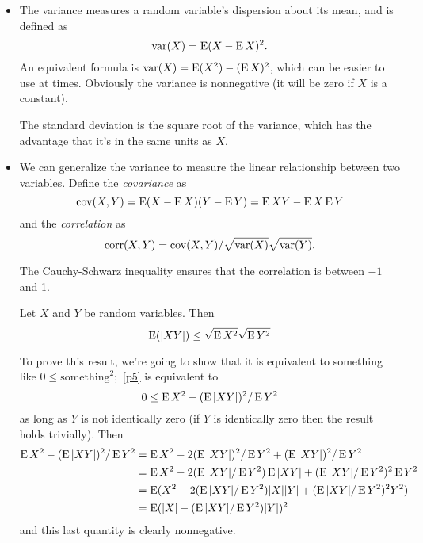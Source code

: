 \begin{itemize}[leftmargin=0pt]

\item The variance measures a random variable's dispersion about its
  mean, and is defined as
  \begin{equation*}
    \operatorname{var}(X) = \operatorname{E}(X - \operatorname{E} X)^2.
  \end{equation*}
  An equivalent formula is $\operatorname{var}(X) = \operatorname{E}(X^2) - (\operatorname{E} X)^2$, which can be
  easier to use at times.  Obviously the variance is nonnegative (it
  will be zero if $X$ is a constant).

  The standard deviation is the square root of the variance, which has
  the advantage that it's in the same units as $X$.

\item We can generalize the variance to measure the linear
  relationship between two variables.  Define the \emph{covariance} as
  \begin{equation*}
    \operatorname{cov}(X,Y) = \operatorname{E}(X - \operatorname{E} X) (Y - \operatorname{E} Y) = \operatorname{E} XY - \operatorname{E} X \operatorname{E} Y
  \end{equation*}
  and the \emph{correlation} as
  \begin{equation*}
    \operatorname{corr}(X, Y) = \operatorname{cov}(X,Y) / \sqrt{\operatorname{var}(X)} \sqrt{\operatorname{var}(Y)}.
  \end{equation*}

  The Cauchy-Schwarz inequality ensures that the correlation is
  between $-1$ and 1.
  \begin{thm}
    Let $X$ and $Y$ be random variables.  Then 
    \begin{equation}\label{p5}
      \E (|X Y|) \leq \sqrt{\E X^2} \sqrt{\E Y^2}
    \end{equation}
  \end{thm}
  To prove this result, we're going to show that it is equivalent to
  something like $0 \leq \text{something}^2$;~\eqref{p5} is equivalent to
  \begin{equation*}
    0 \leq \operatorname{E} X^2 - (\operatorname{E} |X Y|)^2 / \operatorname{E} Y^2
  \end{equation*}
  as long as $Y$ is not identically zero (if $Y$ is identically zero
  then the result holds trivially).  Then
  \begin{align*}
    \operatorname{E} X^2 - (\operatorname{E} |X Y|)^2 / \operatorname{E} Y^2
    &= \operatorname{E} X^2 - 2 (\operatorname{E} |XY|)^2/ \operatorname{E} Y^2 + (\operatorname{E} |XY|)^2/ \operatorname{E} Y^2 \\
    &= \operatorname{E} X^2 - 2(\operatorname{E} |XY| / \operatorname{E} Y^2) \operatorname{E} |XY| + (\operatorname{E} |XY|/\operatorname{E} Y^2)^2 \operatorname{E} Y^2 \\
    &= \operatorname{E}(X^2 - 2(\operatorname{E} |XY| / \operatorname{E} Y^2) |X| |Y| + (\operatorname{E} |XY|/\operatorname{E} Y^2)^2 Y^2) \\
    &= \operatorname{E}(|X| - (\operatorname{E} |XY|/\operatorname{E} Y^2) |Y|)^2
  \end{align*}
  and this last quantity is clearly nonnegative.


\end{itemize}
